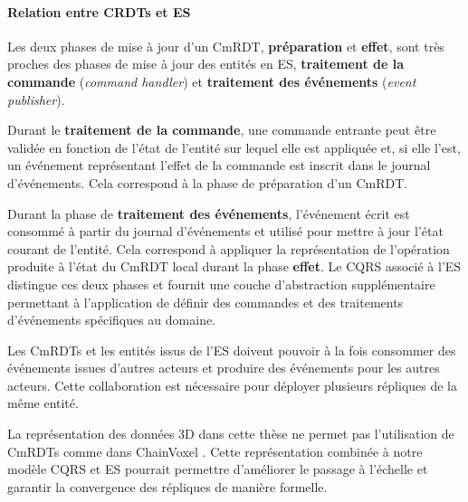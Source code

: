 \paragraph{Relation entre \glspl{CRDT} et \acrlong{ES}}
Les deux phases de mise à jour d'un CmRDT, \textbf{préparation} et \textbf{effet}, 
sont très proches des phases de mise à jour des entités en \gls{ES}, 
\textbf{traitement de 
la commande }(\textit{command handler}) et \textbf{traitement des événements} 
(\textit{event 
publisher}). 

Durant le \textbf{traitement de la commande}, une commande entrante peut être 
validée en fonction de l'état de l'entité sur lequel elle est appliquée et, si elle l'est, 
un événement représentant l'effet de la commande est inscrit dans le journal 
d'événements. Cela correspond à la phase de préparation d'un CmRDT. 

Durant la 
phase de \textbf{traitement des événements}, l'événement écrit est consommé à 
partir du journal d'événements et utilisé pour mettre à jour l'état courant de l'entité. 
Cela correspond à appliquer la représentation de l'opération produite à l'état du 
CmRDT local durant la phase \textbf{effet}. Le \gls{CQRS} associé à l'\gls{ES} 
distingue ces deux phases et fournit une couche d'abstraction supplémentaire 
permettant à l'application de définir des 
commandes et des traitements d'événements spécifiques au domaine.

Les CmRDTs et les entités issus de l'\gls{ES} doivent pouvoir à la fois 
consommer des événements issues d'autres acteurs et produire des événements 
pour les autres acteurs. Cette collaboration est nécessaire pour déployer plusieurs 
répliques de la même entité. 

La représentation des données 3D dans cette thèse ne permet pas l'utilisation de 
CmRDTs comme dans ChainVoxel \cite{Imae2016}. Cette représentation 
combinée à notre modèle \gls{CQRS} et \gls{ES} pourrait permettre d'améliorer le 
passage à l'échelle et garantir la convergence des répliques de manière formelle.
%




